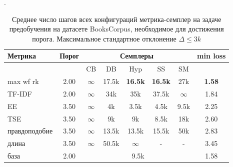 \documentclass{spbau-diploma}
\begin{document}
\begin{table}
	\caption{Среднее число шагов всех конфигураций метрика-семплер на задаче предобучения на датасете BooksCorpus, необходимое для достижения порога. Максимальное стандартное отклонение $\Delta \le 3k$}.		\label{table:BooksCorpus_pretraining}
	\centering
	\begin{tabular}{|l|c|ccccc|c|}
		\hline
		Метрика & Порог & & \multicolumn{3}{c}{Семплеры} & & min loss\\
		\hline
		& & CB & DB & Hyp & SS & SM & \\
		\hline
		max wf rk & 2.00 & $\infty$ & 17.5k & {\bf 16.5k} & {\bf 16.5k} & 27k & {\bf 1.58} \\
		TF-IDF & 2.00 & $\infty$ & 34k & 35k & 37.5k & $\infty$ & 1.84 \\
		\hline
		\hline
		EE & 3.50 & $\infty$ & 4k & 3.5k & 4.5k & 9.5k & 2.25 \\
		TSE & 3.50 & $\infty$ & 9k & 9k & 8.5k & 18k & 2.60 \\
		правдоподобие & 3.50 & $\infty$ & 13.5k & 13.5k & 15.5k & 50k & 2.83 \\
		длина & 3.50 & $\infty$ & 50.5k & $\infty$ & - & - & 3.45 \\
		\hline
		\hline
		база & 2.00 & \multicolumn{5}{c}{9.5k} & 1.58 \\
		\hline
	\end{tabular}
\end{table}
\end{document}
